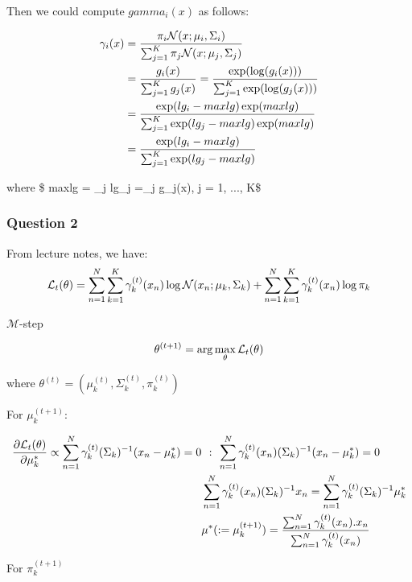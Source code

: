 \documentclass[11pt]{article}
\begin{document}
    Then we could compute \(gamma_i(x)\) as follows:

\begin{align}
\large \gamma_i(x) &=  \large \frac{\pi_i \mathcal{N}(x;\mu_i, \Sigma_i)}{ \sum_{j=1}^K \pi_j \mathcal{N}(x;\mu_j, \Sigma_j)} \\
& \large = \frac {g_i(x)}{\sum_{j=1}^K g_j(x)} = \frac {\exp(\log(g_i(x)))}{\sum_{j=1}^K \exp(\log(g_j(x)))} \\
&  \large =  \frac{\exp(lg_i- maxlg)\exp(maxlg)}{\sum_{j=1}^K \exp(lg_j-maxlg) \exp(maxlg)} \\
&  \large =  \frac{\exp(lg_i-maxlg)}{\sum_{j=1}^K \exp(lg_j-maxlg)}
\end{align}

where \$ maxlg = \max\_j lg\_j =\max\_j \log g\_j(x), j = 1, ..., K\$

    \subsubsection{Question 2}\label{question-2}

    From lecture notes, we have: \[
\large \mathcal{L}_t(\theta) =  \sum_{n=1}^N \sum_{k=1}^K  \gamma_k^{(t)} (x_n) \log \mathcal{N}(x_n;\mu_k, \Sigma_k) + \sum_{n=1}^N \sum_{k=1}^K  \gamma_k^{(t)} (x_n) \log \pi_k\\
\]

\(\mathcal{M}\)-step

\begin{equation*}
\large \theta^{(t+1)} = \arg \max_\theta \mathcal{L}_t(\theta) 
\end{equation*}

where \(\theta^{(t)} = (\mu_k^{(t)}, \Sigma_k^{(t)}, \pi_k^{(t)})\)

For \(\mu_k^{(t+1)}\):

\begin{align}
\large \frac{\partial \mathcal{L}_t(\theta) }{\partial \mu_k^*}  \propto \sum_{n=1}^N \gamma_k^{(t)} (\Sigma_k)^{-1}(x_n-\mu_k^*) = 0 
& \large \  : \  \sum_{n=1}^N \gamma_k^{(t)}(x_n) (\Sigma_k)^{-1}(x_n-\mu_k^*) = 0  \\
& \large  \sum_{n=1}^N \gamma_k^{(t)}(x_n) (\Sigma_k)^{-1} x_n =  \sum_{n=1}^N \gamma_k^{(t)} (\Sigma_k)^{-1}\mu_k^*  \\
& \large   \mu^*(: = \mu_k^{(t+1)}) = \frac{\sum_{n=1}^N \gamma_k^{(t)}(x_n). x_n}{\sum_{n=1}^N \gamma_k^{(t)}(x_n)}
\end{align}

    For \(\pi_k^{(t+1)}\)
\end{document}

